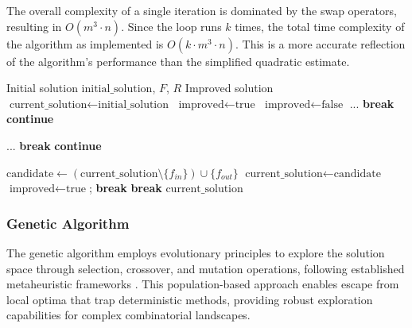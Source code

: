 \documentclass[12pt,a4paper]{article}
\begin{document}
The overall complexity of a single iteration is dominated by the swap operators, resulting in $O(m^3 \cdot n)$. Since the loop runs $k$ times, the total time complexity of the algorithm as implemented is $O(k \cdot m^3 \cdot n)$. This is a more accurate reflection of the algorithm's performance than the simplified quadratic estimate.


\begin{algorithm}[H]
	\caption{Local Search Improvement}
	\label{alg:local-search}
	\begin{algorithmic}[1]
		\Require Initial solution $\text{initial\_solution}$, $F$, $R$
		\Ensure Improved solution
		\State $\text{current\_solution} \gets \text{initial\_solution}$
		\State $\text{improved} \gets \text{true}$
		\State $\text{improved} \gets \text{false}$
		 ... \textbf{break} \EndFor
		 \textbf{continue} \EndIf

		 ... \textbf{break} \EndFor
		 \textbf{continue} \EndIf

		\State $\text{candidate} \gets (\text{current\_solution} \setminus \{f_{in}\}) \cup \{f_{out}\}$
		\State $\text{current\_solution} \gets \text{candidate}$
		\State $\text{improved} \gets \text{true}$; \textbf{break}
		\EndIf
		\EndIf
		\EndFor
		 \textbf{break} \EndIf
		\EndFor
		\EndWhile
		\State \Return $\text{current\_solution}$
	\end{algorithmic}
\end{algorithm}

\subsubsection{Genetic Algorithm}
The genetic algorithm employs evolutionary principles to explore the solution space through selection, crossover, and mutation operations, following established metaheuristic frameworks \cite{metaheuristica,talbi}. This population-based approach enables escape from local optima that trap deterministic methods, providing robust exploration capabilities for complex combinatorial landscapes.
\end{document}
